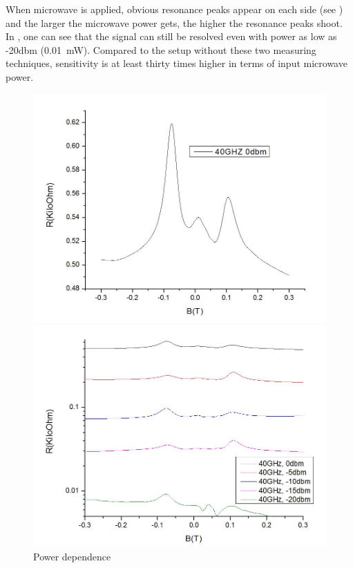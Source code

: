 \documentclass[12pt]{ruthesis}
\begin{document}
When microwave is applied, obvious resonance peaks appear on each side (see ) and the larger the microwave power gets, the higher the resonance peaks shoot. In , one can see that the signal can still be resolved even with power as low as -20dbm (\SI{0.01}{\milli \watt}). 
Compared to the setup without these two measuring techniques, sensitivity is at least thirty times higher in terms of input microwave power.  



\begin{figure}[!htb]\centering
   \begin{minipage}{0.49\textwidth}
     \includegraphics[width=\linewidth]{figures/0dbm.JPG}
     \caption{CR at 0 dbm \SI{40}{\giga \hertz}}\label{0dbm_40ghz}
   \end{minipage}
   \begin {minipage}{0.49\textwidth}
     \includegraphics[width=\linewidth]{figures/thermopowerdep.JPG}
     \caption{Power dependence}\label{thermopowerdep}
   \end{minipage}
\end{figure}
 
\end{document}

